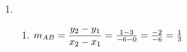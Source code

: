 \begin{eocsolutions}{}
{\begin{enumerate}[itemsep=5pt, label=\textbf{\arabic*}. ]
\begin{enumerate}[itemsep=5pt, label=\textbf{(\alph*)} ]
Two sides of the triangle are equal in length, therefore $\triangle ABC$ is isosceles.
\item
$M_{AC} = (\dfrac{x_1+x_2}{2};\dfrac{y_1+y_2}{2})\\[4pt]
    = (\frac{1+6}{2};\frac{3+4}{2})\\
    = (\frac{7}{2};\frac{7}{2})$
\item
$m_{AB} = \dfrac{y_2-y_1}{x_2-x_1}\\
    = \frac{1-3}{4-1}\\
    = \frac{-2}{3}$\\
$m_{BD} = \dfrac{y_2-y_1}{x_2-x_1}\\
    = \frac{-1-1}{7-4}\\
    = \frac{-2}{3}$\\
$m_{AD} = \dfrac{y_2-y_1}{x_2-x_1}\\
    = \frac{-1-3}{7-1}\\
    = \frac{-2}{3}$\\
Therefore $A,B$ and $D$ are collinear.
\end{enumerate}
\item  %
\begin{enumerate}[itemsep=5pt, label=\textbf{(\alph*)} ] 
\item
$m_{AB} = \dfrac{y_2-y_1}{x_2-x_1}\\
    = \frac{1-3}{-6-0}\\
    = \frac{-2}{-6}\\
    = \frac{1}{3}$\\


\end{enumerate}
\end{enumerate}}
\end{eocsolutions}
